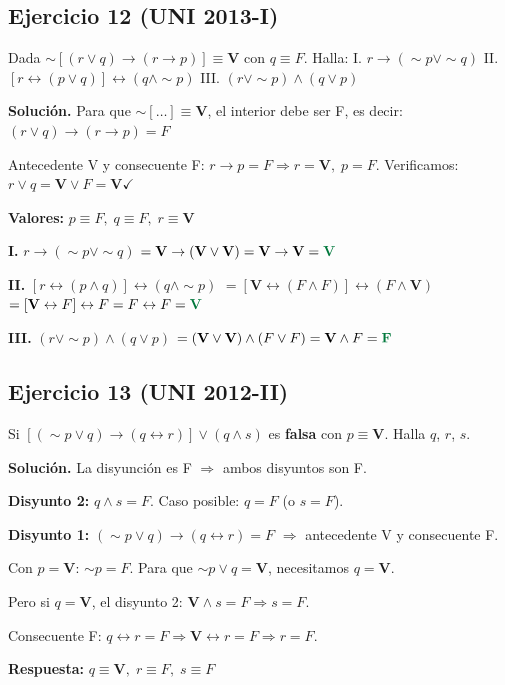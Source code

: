 \documentclass[12pt,a4paper]{article}
\newcommand{\V}{\textbf{V}}
\newcommand{\F}{F}
\newcommand{\resultado}[1]{\textcolor{verde}{\textbf{#1}}}
\begin{document}
\bigskip

\subsection*{Ejercicio 12 \small(UNI 2013-I)}

\begin{enunciado}
Dada $\sim[(r\vee q)\rightarrow(r\rightarrow p)]\equiv\V$ con $q\equiv\F$. Halla:
I. $r\rightarrow(\sim p\vee\sim q)$ \quad
II. $[r\leftrightarrow(p\vee q)]\leftrightarrow(q\wedge\sim p)$ \quad
III. $(r\vee\sim p)\wedge(q\vee p)$
\end{enunciado}

\begin{solucion}
\textbf{Solución.} Para que $\sim[\ldots]\equiv\V$, el interior debe ser F, es decir:
$(r\vee q)\rightarrow(r\rightarrow p) = \F$

Antecedente V y consecuente F:
$r\rightarrow p=\F \Rightarrow r=\V,\; p=\F$. Verificamos: $r\vee q=\V\vee\F=\V\checkmark$

\textbf{Valores:} $p\equiv\F,\; q\equiv\F,\; r\equiv\V$

\medskip
\textbf{I.} $r\rightarrow(\sim p\vee\sim q)$
$= \V\rightarrow(\V\vee\V)=\V\rightarrow\V=\resultado{V}$

\textbf{II.} $[r\leftrightarrow(p\wedge q)]\leftrightarrow(q\wedge\sim p)$
$=[\V\leftrightarrow(\F\wedge\F)]\leftrightarrow(\F\wedge\V)$
$=[\V\leftrightarrow\F]\leftrightarrow\F=\F\leftrightarrow\F=\resultado{V}$

\textbf{III.} $(r\vee\sim p)\wedge(q\vee p)$
$=(\V\vee\V)\wedge(\F\vee\F)=\V\wedge\F=\resultado{F}$
\end{solucion}

\bigskip

\subsection*{Ejercicio 13 \small(UNI 2012-II)}

\begin{enunciado}
Si $[(\sim p\vee q)\rightarrow(q\leftrightarrow r)]\vee(q\wedge s)$ es \textbf{falsa} con $p\equiv\V$. Halla $q$, $r$, $s$.
\end{enunciado}

\begin{solucion}
\textbf{Solución.} La disyunción es F $\Rightarrow$ ambos disyuntos son F.

\textbf{Disyunto 2:} $q\wedge s=\F$. Caso posible: $q=\F$ (o $s=\F$).

\textbf{Disyunto 1:} $(\sim p\vee q)\rightarrow(q\leftrightarrow r)=\F$
$\Rightarrow$ antecedente V y consecuente F.

Con $p=\V$: $\sim p=\F$. Para que $\sim p\vee q=\V$, necesitamos $q=\V$.

Pero si $q=\V$, el disyunto 2: $\V\wedge s=\F \Rightarrow s=\F$.

Consecuente F: $q\leftrightarrow r=\F \Rightarrow \V\leftrightarrow r=\F \Rightarrow r=\F$.

\textbf{Respuesta:} \resultado{$q\equiv\V,\; r\equiv\F,\; s\equiv\F$}
\end{solucion}
\end{document}
